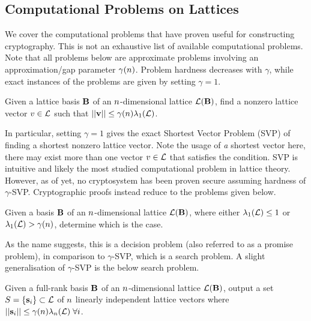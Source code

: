 \subsection{Computational Problems on Lattices}
We cover the computational problems that have proven useful for constructing cryptography. This is not an exhaustive list of available computational problems. Note that all problems below are approximate problems involving an approximation/gap parameter $\gamma(n)$. Problem hardness decreases with $\gamma$, while exact instances of the problems are given by setting $\gamma = 1$.

\begin{definition}
    Given a lattice basis $\mathbf{B}$ of an $n$-dimensional lattice $\mathcal{L}(\mathbf{B})$, find a nonzero lattice vector $v \in \mathcal{L}$ such that $||\mathbf{v}|| \leq \gamma(n) \lambda_1(\mathcal{L})$.
\end{definition}
In particular, setting $\gamma = 1$ gives the exact Shortest Vector Problem (SVP) of finding a shortest nonzero lattice vector. Note the usage of \textit{a} shortest vector here, there may exist more than one vector $v \in \mathcal{L}$ that satisfies the condition. SVP is intuitive and likely the most studied computational problem in lattice theory. However, as of yet, no cryptosystem has been proven secure assuming hardness of $\gamma$-SVP. Cryptographic proofs instead reduce to the problems given below.

\begin{definition}
    Given a basis $\mathbf{B}$ of an $n$-dimensional lattice $\mathcal{L}(\mathbf{B})$, where either $\lambda_1(\mathcal{L}) \leq 1$ or $\lambda_1(\mathcal{L}) > \gamma(n)$, determine which is the case.
\end{definition}

As the name suggests, this is a decision problem (also referred to as a promise problem), in comparison to $\gamma$-SVP, which is a search problem. A slight generalisation of $\gamma$-SVP is the below search problem.

\begin{definition}
    Given a full-rank basis $\mathbf{B}$ of an $n$-dimensional lattice $\mathcal{L}(\mathbf{B})$, output a set $S = \{ \mathbf{s}_i \} \subset \mathcal{L}$ of $n$ linearly independent lattice vectors where $|| \mathbf{s}_i || \leq \gamma(n) \lambda_n(\mathcal{L}) \; \forall i$.
\end{definition}

